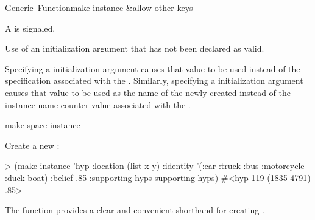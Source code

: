 \documentclass[10pt,twoside,english,pdftex]{article}
\begin{document}
\begin{functiondoc}{Generic~Function}{make-instance}{
     
     \&allow-other-keys \returns{} }
\begin{tightenumerate}
\item A  is signaled.

\end{tightenumerate}

\fnerrors
Use of an initialization argument that has not been declared as valid.

%
%
%
\fndescription Specifying a  initialization argument
causes that value to be used instead of the 
specification associated with the . Similarly, specifying a
 initialization argument causes that value to be used as
the name of the newly created  instead of the
instance-name counter value associated with the .

\begin{alsos}{make-space-instance}
\end{alsos}

\fnexample
Create a new  :
\begin{example}
> (make-instance 'hyp 
     :location (list x y)
     :identity '(:car :truck :bus :motorcycle :duck-boat)
     :belief .85
     :supporting-hyps supporting-hyps)
#<hyp 119 (1835 4791) .85>
\end{example}

\fnnotes 
{}%
The function \textbf{} provides a clear and
convenient shorthand for creating .

\end{functiondoc}

\end{document}

